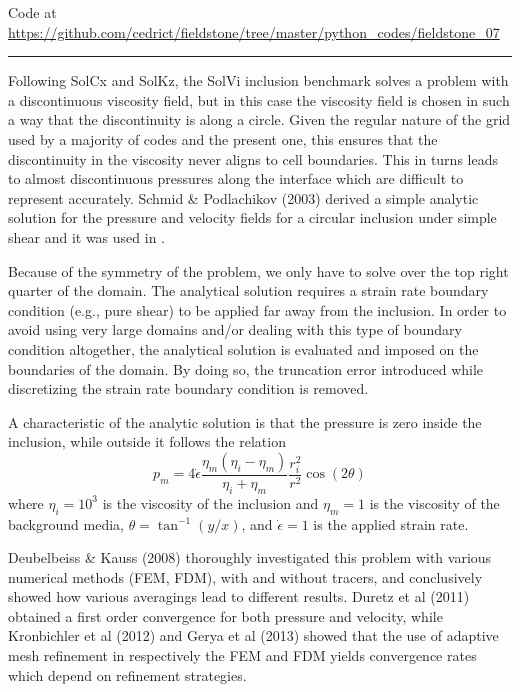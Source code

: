 

\begin{center}
Code at \url{https://github.com/cedrict/fieldstone/tree/master/python_codes/fieldstone_07}
\end{center}

\par\noindent\rule{\textwidth}{0.4pt}

Following SolCx and SolKz, the SolVi inclusion benchmark solves 
a problem with a discontinuous viscosity field, but in this case 
the viscosity field is chosen in such a way that the discontinuity 
is along a circle. Given the regular nature of the grid used by a majority of codes and the present one, 
this ensures that the discontinuity in the viscosity never aligns to cell boundaries.
This in turns leads to almost discontinuous pressures along the interface which are difficult to represent accurately.
Schmid \& Podlachikov (2003) \cite{scpo03} derived a simple analytic solution for the pressure and 
velocity fields for a circular 
inclusion under simple shear and it was used in \cite{deka08,sunh10,dumg11,krhb12,gemd13}.

Because of the symmetry of the problem, we only have to solve over the top right quarter of the domain.
The analytical solution requires a strain rate boundary condition (e.g., pure shear) to be applied far away 
from the inclusion. In order to avoid using very large domains and/or dealing with this type of boundary condition 
altogether, the analytical solution is evaluated and imposed on the boundaries of the domain. 
By doing so, the truncation error introduced while discretizing the strain rate boundary condition is removed.

A characteristic of the analytic solution is that the pressure is zero inside the inclusion, while outside it follows the relation
\begin{equation}
p_m = 4 \dot{\epsilon}
\frac{\eta_m(\eta_i-\eta_m)}{\eta_i+\eta_m}
\frac{r_i^2}{r^2} \cos(2\theta)
\end{equation}
where $\eta_i = 10^3$ is the viscosity of the inclusion 
and $\eta_m = 1$ is the viscosity of the background media, $\theta=\tan^{-1}(y/x)$,
and $\dot{\epsilon}=1$ is the applied strain rate.

Deubelbeiss \& Kauss (2008) \cite{deka08} thoroughly investigated this problem with various 
numerical methods (FEM, FDM), with and without tracers, 
and conclusively showed how various averagings lead to different results. 
Duretz et al (2011) \cite{dumg11} obtained a first order convergence for both pressure and velocity, 
while Kronbichler et al (2012) \cite{krhb12}
and Gerya et al (2013) \cite{gemd13} showed that the use of adaptive mesh refinement in respectively the FEM and FDM 
yields convergence rates which depend on refinement strategies. 

